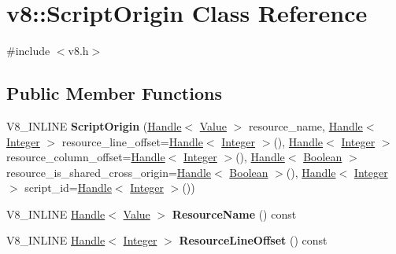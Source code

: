 \hypertarget{classv8_1_1ScriptOrigin}{}\section{v8\+:\+:Script\+Origin Class Reference}
\label{classv8_1_1ScriptOrigin}


{\ttfamily \#include $<$v8.\+h$>$}

\subsection*{Public Member Functions}
\begin{DoxyCompactItemize}
\item 
\hypertarget{classv8_1_1ScriptOrigin_add31e4754a4b7173c2f7e6c3af306721}{}V8\+\_\+\+I\+N\+L\+I\+N\+E {\bfseries Script\+Origin} (\hyperlink{classv8_1_1Handle}{Handle}$<$ \hyperlink{classv8_1_1Value}{Value} $>$ resource\+\_\+name, \hyperlink{classv8_1_1Handle}{Handle}$<$ \hyperlink{classv8_1_1Integer}{Integer} $>$ resource\+\_\+line\+\_\+offset=\hyperlink{classv8_1_1Handle}{Handle}$<$ \hyperlink{classv8_1_1Integer}{Integer} $>$(), \hyperlink{classv8_1_1Handle}{Handle}$<$ \hyperlink{classv8_1_1Integer}{Integer} $>$ resource\+\_\+column\+\_\+offset=\hyperlink{classv8_1_1Handle}{Handle}$<$ \hyperlink{classv8_1_1Integer}{Integer} $>$(), \hyperlink{classv8_1_1Handle}{Handle}$<$ \hyperlink{classv8_1_1Boolean}{Boolean} $>$ resource\+\_\+is\+\_\+shared\+\_\+cross\+\_\+origin=\hyperlink{classv8_1_1Handle}{Handle}$<$ \hyperlink{classv8_1_1Boolean}{Boolean} $>$(), \hyperlink{classv8_1_1Handle}{Handle}$<$ \hyperlink{classv8_1_1Integer}{Integer} $>$ script\+\_\+id=\hyperlink{classv8_1_1Handle}{Handle}$<$ \hyperlink{classv8_1_1Integer}{Integer} $>$())\label{classv8_1_1ScriptOrigin_add31e4754a4b7173c2f7e6c3af306721}

\item 
\hypertarget{classv8_1_1ScriptOrigin_a289502d71720ca10e53b4a32d9226f58}{}V8\+\_\+\+I\+N\+L\+I\+N\+E \hyperlink{classv8_1_1Handle}{Handle}$<$ \hyperlink{classv8_1_1Value}{Value} $>$ {\bfseries Resource\+Name} () const \label{classv8_1_1ScriptOrigin_a289502d71720ca10e53b4a32d9226f58}

\item 
\hypertarget{classv8_1_1ScriptOrigin_a0735178b8afef9169a3481cf6cd7c557}{}V8\+\_\+\+I\+N\+L\+I\+N\+E \hyperlink{classv8_1_1Handle}{Handle}$<$ \hyperlink{classv8_1_1Integer}{Integer} $>$ {\bfseries Resource\+Line\+Offset} () const \label{classv8_1_1ScriptOrigin_a0735178b8afef9169a3481cf6cd7c557}


\end{DoxyCompactItemize}
